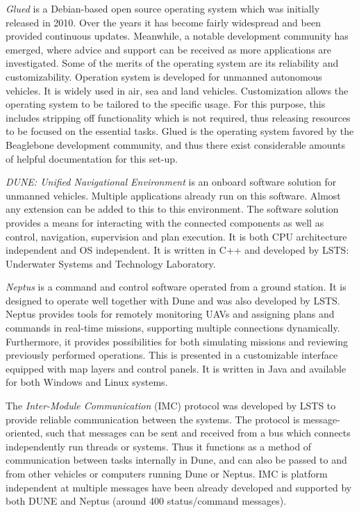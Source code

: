 \textit{Glued} is a Debian-based open source operating system which was initially released in 2010.  Over the years it has become fairly widespread and been provided continuous updates.  Meanwhile, a notable development community has emerged, where advice and support can be received as more applications are investigated. Some of the merits of the operating system are its reliability and customizability. Operation system is developed for unmanned autonomous vehicles. It is widely used in air, sea and land vehicles. Customization allows the operating system to be tailored to the specific usage. For this purpose, this includes stripping off functionality which is not required, thus releasing resources to be focused on the essential tasks. Glued is the operating system favored by the Beaglebone development community, and thus there exist considerable amounts of helpful documentation for this set-up.

\textit{DUNE: Unified Navigational Environment} is an onboard software solution for unmanned vehicles. Multiple applications already run on this software. Almost any extension can be added to this to this environment. The software solution provides a means for interacting with the connected components as well as control, navigation, supervision and plan execution.  It is both CPU architecture independent and OS independent.  It is written in C++ and developed by LSTS: Underwater Systems and Technology Laboratory.

\textit{Neptus} \cite{pinto2006neptus,dias2006mission,dias2005neptus} is a command and control software operated from a ground station. It is designed to operate well together with Dune and was also developed by LSTS. Neptus provides tools for remotely monitoring UAVs and assigning plans and commands in real-time missions, supporting multiple connections dynamically. Furthermore, it provides possibilities for both simulating missions and reviewing previously performed operations. This is presented in a customizable interface equipped with map layers and control panels. It is written in Java and available for both Windows and Linux systems.

The \textit{Inter-Module Communication} \cite{martins2009imc} (IMC) protocol was developed by LSTS to provide reliable communication between the systems.  The protocol is message-oriented, such that messages can be sent and received from a bus which connects independently run threads or systems.  Thus it functions as a method of communication between tasks internally in Dune, and can also be passed to and from other vehicles or computers running Dune or Neptus.  IMC is platform independent at multiple messages have been already developed and supported by both DUNE and Neptus (around 400 status/command messages).

